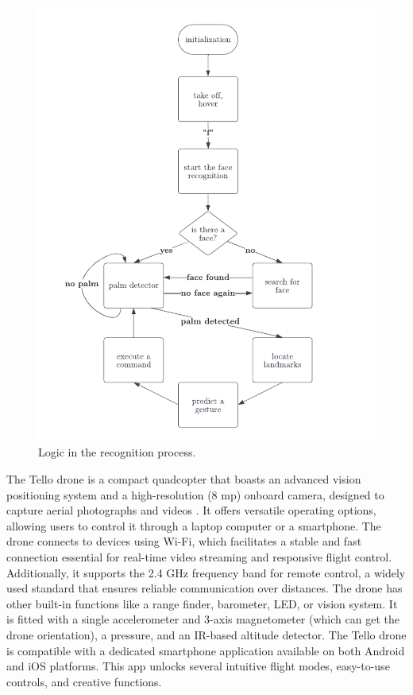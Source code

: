 \begin{figure}
	\centering
	\includegraphics[width =1.1 \textwidth]{images/flowchart.pdf}
	\caption{Logic in the recognition process.}
	\label{fig:flowchart}
\end{figure}

The Tello drone is a compact quadcopter that boasts an advanced vision positioning system and a high-resolution (8 mp) onboard camera, designed to capture aerial photographs and videos \cite{tello2023specs}.
 It offers versatile operating options, allowing users to control it through a laptop computer or a smartphone. The drone connects to devices using Wi-Fi, which facilitates a stable and fast connection essential for real-time video streaming and responsive flight control. Additionally, it supports the 2.4 GHz frequency band for remote control, a widely used standard that ensures reliable communication over distances. The drone has other built-in functions like a range finder, barometer, LED, or vision system. It is fitted with a single accelerometer and 3-axis magnetometer (which can get the drone orientation), a pressure, and an IR-based altitude detector. The Tello drone is compatible with a dedicated smartphone application available on both Android and iOS platforms. This app unlocks several intuitive flight modes, easy-to-use controls, and creative functions.

